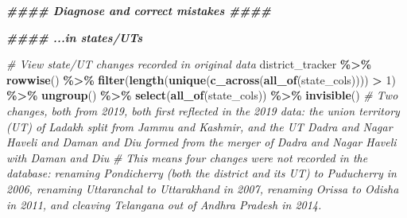 \documentclass[
]{article}
\newenvironment{Shaded}{\begin{snugshade}}{\end{snugshade}}
\newcommand{\CommentTok}[1]{\textcolor[rgb]{0.56,0.35,0.01}{\textit{#1}}}
\newcommand{\DecValTok}[1]{\textcolor[rgb]{0.00,0.00,0.81}{#1}}
\newcommand{\DocumentationTok}[1]{\textcolor[rgb]{0.56,0.35,0.01}{\textbf{\textit{#1}}}}
\newcommand{\FunctionTok}[1]{\textcolor[rgb]{0.13,0.29,0.53}{\textbf{#1}}}
\newcommand{\NormalTok}[1]{#1}
\newcommand{\SpecialCharTok}[1]{\textcolor[rgb]{0.81,0.36,0.00}{\textbf{#1}}}
\begin{document}
\begin{Shaded}
\begin{Highlighting}[]
\DocumentationTok{\#\#\#\# Diagnose and correct mistakes \#\#\#\#}

\DocumentationTok{\#\#\#\# ...in states/UTs}

\CommentTok{\# View state/UT changes recorded in original data}
\NormalTok{district\_tracker }\SpecialCharTok{\%\textgreater{}\%} 
  \FunctionTok{rowwise}\NormalTok{() }\SpecialCharTok{\%\textgreater{}\%} 
  \FunctionTok{filter}\NormalTok{(}\FunctionTok{length}\NormalTok{(}\FunctionTok{unique}\NormalTok{(}\FunctionTok{c\_across}\NormalTok{(}\FunctionTok{all\_of}\NormalTok{(state\_cols)))) }\SpecialCharTok{\textgreater{}} \DecValTok{1}\NormalTok{) }\SpecialCharTok{\%\textgreater{}\%} 
  \FunctionTok{ungroup}\NormalTok{() }\SpecialCharTok{\%\textgreater{}\%} 
  \FunctionTok{select}\NormalTok{(}\FunctionTok{all\_of}\NormalTok{(state\_cols)) }\SpecialCharTok{\%\textgreater{}\%} 
  \FunctionTok{invisible}\NormalTok{()}
\CommentTok{\# Two changes, both from 2019, both first reflected in the 2019 data: the union territory (UT) of Ladakh split from Jammu and Kashmir, and the UT Dadra and Nagar Haveli and Daman and Diu formed from the merger of Dadra and Nagar Haveli with Daman and Diu}
\CommentTok{\# This means four changes were not recorded in the database: renaming Pondicherry (both the district and its UT) to Puducherry in 2006, renaming Uttaranchal to Uttarakhand in 2007, renaming Orissa to Odisha in 2011, and cleaving Telangana out of Andhra Pradesh in 2014.}


\end{Highlighting}
\end{Shaded}
\end{document}
